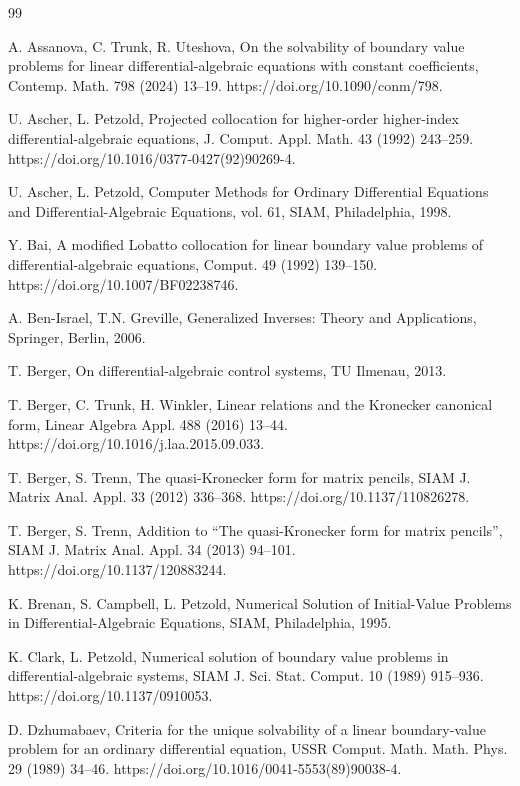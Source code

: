 \documentclass[preprint,12pt]{elsarticle}
\numberwithin{equation}{section}
\theoremstyle{definition}
\begin{document}
\begin{thebibliography}{99}

A. Assanova, C. Trunk, R. Uteshova, On the solvability of boundary value problems for linear differential-algebraic equations with constant coefficients, Contemp. Math. 798 (2024) 13–19. https://doi.org/10.1090/conm/798.

U. Ascher, L. Petzold, Projected collocation for higher-order higher-index differential-algebraic equations, J. Comput. Appl. Math. 43 (1992) 243–259. https://doi.org/10.1016/0377-0427(92)90269-4.

U. Ascher, L. Petzold, Computer Methods for Ordinary Differential Equations and Differential-Algebraic Equations, vol. 61, SIAM, Philadelphia, 1998.

Y. Bai, A modified Lobatto collocation for linear boundary value problems of differential-algebraic equations, Comput. 49 (1992) 139–150. https://doi.org/10.1007/BF02238746.

A. Ben-Israel, T.N. Greville, Generalized Inverses: Theory and Applications, Springer, Berlin, 2006.

T. Berger, On differential-algebraic control systems, TU Ilmenau, 2013.

T. Berger, C. Trunk, H. Winkler, Linear relations and the Kronecker canonical form, Linear Algebra Appl. 488 (2016) 13–44. https://doi.org/10.1016/j.laa.2015.09.033.

T. Berger, S. Trenn, The quasi-Kronecker form for matrix pencils, SIAM J. Matrix Anal. Appl. 33 (2012) 336–368. https://doi.org/10.1137/110826278.

T. Berger, S. Trenn, Addition to “The quasi-Kronecker form for matrix pencils”, SIAM J. Matrix Anal. Appl. 34 (2013) 94–101. https://doi.org/10.1137/120883244.

K. Brenan, S. Campbell, L. Petzold, Numerical Solution of Initial-Value Problems in Differential-Algebraic Equations, SIAM, Philadelphia, 1995.

K. Clark, L. Petzold, Numerical solution of boundary value problems in differential-algebraic systems, SIAM J. Sci. Stat. Comput. 10 (1989) 915–936. https://doi.org/10.1137/0910053.

D. Dzhumabaev, Criteria for the unique solvability of a linear boundary-value problem for an ordinary differential equation, USSR Comput. Math. Math. Phys. 29 (1989) 34–46. https://doi.org/10.1016/0041-5553(89)90038-4.


\end{thebibliography}
\end{document}
